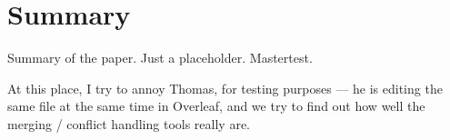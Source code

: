 \chapter{Summary}


Summary of the paper. Just a placeholder. Mastertest.

At this place, I try to annoy Thomas, for testing purposes --- he is editing the same file at the same time in Overleaf, and we try to find out how well the merging / conflict handling tools really are. 

